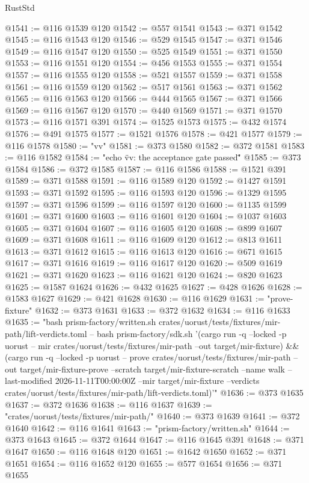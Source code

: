 \begin{lexlean}{RustStd}
\begin{coremodule}
@1541 := @116 @1539 @120
@1542 := @557 @1541
@1543 := @371 @1542
@1545 := @116 @1543 @120
@1546 := @529 @1545
@1547 := @371 @1546
@1549 := @116 @1547 @120
@1550 := @525 @1549
@1551 := @371 @1550
@1553 := @116 @1551 @120
@1554 := @456 @1553
@1555 := @371 @1554
@1557 := @116 @1555 @120
@1558 := @521 @1557
@1559 := @371 @1558
@1561 := @116 @1559 @120
@1562 := @517 @1561
@1563 := @371 @1562
@1565 := @116 @1563 @120
@1566 := @444 @1565
@1567 := @371 @1566
@1569 := @116 @1567 @120
@1570 := @440 @1569
@1571 := @371 @1570
@1573 := @116 @1571 @391
@1574 := @1525 @1573
@1575 := @432 @1574
@1576 := @491 @1575
@1577 := @1521 @1576
@1578 := @421 @1577
@1579 := @116 @1578
@1580 := "vv"
@1581 := @373 @1580
@1582 := @372 @1581
@1583 := @116 @1582
@1584 := "echo \"vv: the acceptance gate passed\""
@1585 := @373 @1584
@1586 := @372 @1585
@1587 := @116 @1586
@1588 := @1521 @391
@1589 := @371 @1588
@1591 := @116 @1589 @120
@1592 := @1427 @1591
@1593 := @371 @1592
@1595 := @116 @1593 @120
@1596 := @1329 @1595
@1597 := @371 @1596
@1599 := @116 @1597 @120
@1600 := @1135 @1599
@1601 := @371 @1600
@1603 := @116 @1601 @120
@1604 := @1037 @1603
@1605 := @371 @1604
@1607 := @116 @1605 @120
@1608 := @899 @1607
@1609 := @371 @1608
@1611 := @116 @1609 @120
@1612 := @813 @1611
@1613 := @371 @1612
@1615 := @116 @1613 @120
@1616 := @671 @1615
@1617 := @371 @1616
@1619 := @116 @1617 @120
@1620 := @509 @1619
@1621 := @371 @1620
@1623 := @116 @1621 @120
@1624 := @820 @1623
@1625 := @1587 @1624
@1626 := @432 @1625
@1627 := @428 @1626
@1628 := @1583 @1627
@1629 := @421 @1628
@1630 := @116 @1629
@1631 := "prove-fixture"
@1632 := @373 @1631
@1633 := @372 @1632
@1634 := @116 @1633
@1635 := "bash prism-factory/written.sh crates/uorust/tests/fixtures/mir-path/lift-verdicts.toml -- bash prism-factory/sdk.sh '(cargo run -q --locked -p uorust -- mir crates/uorust/tests/fixtures/mir-path --out target/mir-fixture) && (cargo run -q --locked -p uorust -- prove crates/uorust/tests/fixtures/mir-path --out target/mir-fixture-prove --scratch target/mir-fixture-scratch --name walk --last-modified 2026-11-11T00:00:00Z --mir target/mir-fixture --verdicts crates/uorust/tests/fixtures/mir-path/lift-verdicts.toml)'"
@1636 := @373 @1635
@1637 := @372 @1636
@1638 := @116 @1637
@1639 := "crates/uorust/tests/fixtures/mir-path/"
@1640 := @373 @1639
@1641 := @372 @1640
@1642 := @116 @1641
@1643 := "prism-factory/written.sh"
@1644 := @373 @1643
@1645 := @372 @1644
@1647 := @116 @1645 @391
@1648 := @371 @1647
@1650 := @116 @1648 @120
@1651 := @1642 @1650
@1652 := @371 @1651
@1654 := @116 @1652 @120
@1655 := @577 @1654
@1656 := @371 @1655

\end{coremodule}
\end{lexlean}
